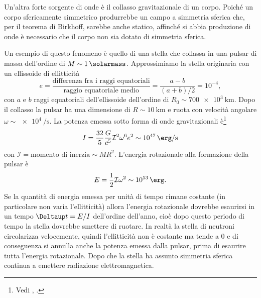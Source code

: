Un'altra forte sorgente di onde è il collasso gravitazionale di un corpo.
Poiché un corpo sfericamente simmetrico produrrebbe un campo a simmetria sferica
che, per il teorema di Birkhoff, sarebbe anche statico, affinché si abbia
produzione di onde è necessario che il corpo non sia dotato di simmetria
sferica.

Un esempio di questo fenomeno è quello di una stella che collassa in una pulsar
di massa dell'ordine di $M \sim \SI{1}{\solarmass}$.  Approssimiamo la stella
originaria con un ellissoide di ellitticità
\begin{equation}
  e = \frac{\text{differenza fra i raggi equatoriali}}{\text{raggio equatoriale
      medio}}  = \frac{a-b}{(a+b)/2} = 10^{-4},
\end{equation}
con $a$ e $b$ raggi equatoriali dell'ellissoide dell'ordine di
$R_{0} \sim \SI{700e3}{\kilo\metre}$.  Dopo il collasso la pulsar ha una
dimensione di $R \sim \SI{10}{\kilo\metre}$ e ruota con velocità angolare
$\omega \sim \SI[per-mode=reciprocal]{e4}{\per\second}$.  La potenza emessa
sotto forma di onde gravitazionali
è\footnote{Vedi \textcite[488]{shapiro:black-holes},
  \textcite[272]{weinberg:gravitation}.}
\begin{equation}
  I = \frac{32}{5} \frac{G}{c^{5}} \mathcal{I}^{2} \omega^{6} e^{2} \sim
  \SI{e47}{\erg\per\second}
\end{equation}
con $\mathcal{I} = \text{momento di inerzia} \sim MR^{2}$.  L'energia
rotazionale alla formazione della pulsar è
\begin{equation}
  E = \frac{1}{2} \mathcal{I} \omega^{2} \sim \SI{e53}{\erg}.
\end{equation}
Se la quantità di energia emessa per unità di tempo rimane costante (in
particolare non varia l'ellitticità) allora l'energia rotazionale dovrebbe
esaurirsi in un tempo $\var t = E/I$ dell'ordine dell'anno, cioè dopo questo
periodo di tempo la stella dovrebbe smettere di ruotare.  In realtà la stella di
neutroni circolarizza velocemente, quindi l'ellitticità non è costante ma tende
a $0$ e di conseguenza si annulla anche la potenza emessa dalla pulsar, prima di
esaurire tutta l'energia rotazionale.  Dopo che la stella ha assunto simmetria
sferica continua a emettere radiazione elettromagnetica.

